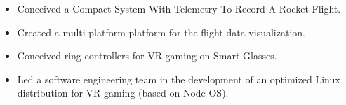 \documentclass[10pt,a4paper,ragged2e]{altacv}
\begin{document}
\vspace{10px}

\begin{itemize}
    \item Conceived a Compact System With Telemetry To Record A Rocket Flight.
    \item Created a multi-platform platform for the flight data visualization.
\end{itemize}

\vspace{10px}

\begin{itemize}
    \item Conceived ring controllers for VR gaming on Smart Glasses.
    \item Led a software engineering team in the development of an optimized Linux distribution for VR gaming (based on Node-OS).
\end{itemize}

\vspace{10px}



\clearpage
\end{document}
